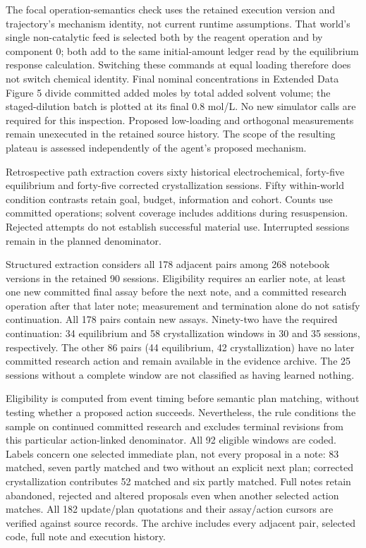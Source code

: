 \documentclass[12pt,a4paper]{article}
\begin{document}
The focal operation-semantics check uses the retained execution version and trajectory's mechanism identity, not current runtime assumptions. That world's single non-catalytic feed is selected both by the reagent operation and by component 0; both add to the same initial-amount ledger read by the equilibrium response calculation. Switching these commands at equal loading therefore does not switch chemical identity. Final nominal concentrations in Extended Data Figure 5 divide committed added moles by total added solvent volume; the staged-dilution batch is plotted at its final 0.8 mol/L. No new simulator calls are required for this inspection. Proposed low-loading and orthogonal measurements remain unexecuted in the retained source history. The scope of the resulting plateau is assessed independently of the agent's proposed mechanism.

Retrospective path extraction covers sixty historical electrochemical, forty-five equilibrium and forty-five corrected crystallization sessions. Fifty within-world condition contrasts retain goal, budget, information and cohort. Counts use committed operations; solvent coverage includes additions during resuspension. Rejected attempts do not establish successful material use. Interrupted sessions remain in the planned denominator.

Structured extraction considers all 178 adjacent pairs among 268 notebook versions in the retained 90 sessions. Eligibility requires an earlier note, at least one new committed final assay before the next note, and a committed research operation after that later note; measurement and termination alone do not satisfy continuation. All 178 pairs contain new assays. Ninety-two have the required continuation: 34 equilibrium and 58 crystallization windows in 30 and 35 sessions, respectively. The other 86 pairs (44 equilibrium, 42 crystallization) have no later committed research action and remain available in the evidence archive. The 25 sessions without a complete window are not classified as having learned nothing.

Eligibility is computed from event timing before semantic plan matching, without testing whether a proposed action succeeds. Nevertheless, the rule conditions the sample on continued committed research and excludes terminal revisions from this particular action-linked denominator. All 92 eligible windows are coded. Labels concern one selected immediate plan, not every proposal in a note: 83 matched, seven partly matched and two without an explicit next plan; corrected crystallization contributes 52 matched and six partly matched. Full notes retain abandoned, rejected and altered proposals even when another selected action matches. All 182 update/plan quotations and their assay/action cursors are verified against source records. The archive includes every adjacent pair, selected code, full note and execution history.
\end{document}
